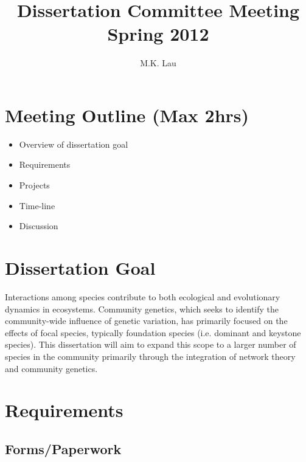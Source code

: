 \documentclass[12pt]{article}
\title{Dissertation Committee Meeting Spring 2012}
\author{M.K. Lau}
\begin{document}
\maketitle

\thispagestyle{empty}

\setcounter{tocdepth}{3}  %
\tableofcontents

\section{Meeting Outline (Max 2hrs)}
\begin{itemize}
\item Overview of dissertation goal 
\item Requirements
\item Projects 
\item Time-line 
\item Discussion
\end{itemize}

\section{Dissertation Goal}
Interactions among species contribute to both ecological and
evolutionary dynamics in ecosystems. Community genetics, which seeks
to identify the community-wide influence of genetic variation, has
primarily focused on the effects of focal species, typically
foundation species (i.e. dominant and keystone species). This
dissertation will aim to expand this scope to a larger number of
species in the community primarily through the integration of network
theory and community genetics.

\section{Requirements}

\subsection{Forms/Paperwork}
\end{document}
